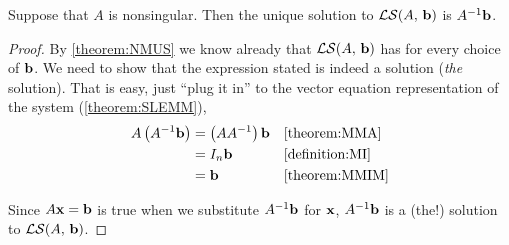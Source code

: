 \documentclass{ximera}
\begin{document}
\begin{theorem}
  \label{theorem:SNCM}

  Suppose that $A$ is nonsingular.  Then the unique solution to
  $\mathcal{LS}\!\left(A,\,\mathbf{b}\right)$ is $A^{-1}\mathbf{b}$.

  \begin{proof}
    By \ref{theorem:NMUS} we know already that
    $\mathcal{LS}\!\left(A,\,\mathbf{b}\right)$ has  for every
  choice of $\mathbf{b}$.  We need to show that the expression stated is
  indeed a solution (\textit{the} solution).  That is easy, just
  ``plug it in'' to the vector equation representation of the system
  (\ref{theorem:SLEMM}),
    \begin{align*}
      A\left(A^{-1}\mathbf{b}\right)
      &=\left(AA^{-1}\right)\mathbf{b}&&\ref{theorem:MMA}\\
      &=I_n\mathbf{b}&&\ref{definition:MI}\\
      &=\mathbf{b}&&\ref{theorem:MMIM}
    \end{align*}

    Since $A\mathbf{x}=\mathbf{b}$ is true when we substitute
    $A^{-1}\mathbf{b}$ for $\mathbf{x}$, $A^{-1}\mathbf{b}$ is a
    (the!) solution to $\mathcal{LS}\!\left(A,\,\mathbf{b}\right)$.
  \end{proof}
\end{theorem}
\end{document}
